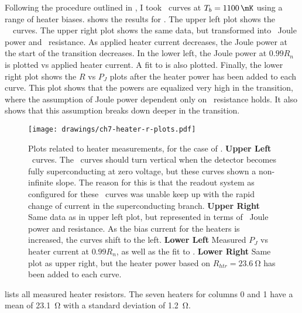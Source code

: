 Following the procedure outlined in , I took \IV\ curves at $T_b = \SI{1100}{\mK}$ using a range of heater biases.
 shows the results for .
The upper left plot shows the \TES\ \IV\ curves.
The upper right plot shows the same data, but transformed into \TES\ Joule power and \TES\ resistance.
As applied heater current decreases, the Joule power at the start of the transition decreases.
In the lower left, the Joule power at $0.99R_{n}$ is plotted vs applied heater current.
A fit to  is also plotted.
Finally, the lower right plot shows the $R$ vs $P_J$ plots after the heater power has been added to each curve.
This plot shows that the powers are equalized very high in the transition, where the assumption of Joule power dependent only on \TES\ resistance holds.
It also shows that this assumption breaks down deeper in the transition.

\begin{figure*}
\texttt{[image: drawings/ch7-heater-r-plots.pdf]}
\caption[Plots related to heater measurements]{
Plots related to heater measurements, for the case of .
\textbf{Upper Left} \IV\ curves. The \IV\ curves should turn vertical when the detector becomes fully superconducting at zero voltage, but these curves shown a non-infinite slope. The reason for this is that the readout system as configured for these \IV\ curves was unable keep up with the rapid change of current in the superconducting branch.
\textbf{Upper Right} Same data as in upper left plot, but represented in terms of \TES\ Joule power and resistance. As the bias current for the heaters is increased, the curves shift to the left.
\textbf{Lower Left} Measured $P_{J}$ vs heater current at $0.99R_n$, as well as the fit to .
\textbf{Lower Right} Same plot as upper right, but the heater power based on $R_{htr} = \SI{23.6}{\ohm}$ has been added to each curve.
}
\label{fig:ch7-heater-r-plots}
\end{figure*}

 lists all measured heater resistors.
The seven heaters for columns 0 and 1 have a mean of \SI{23.1}{\ohm} with a standard deviation of \SI{1.2}{\ohm}.

